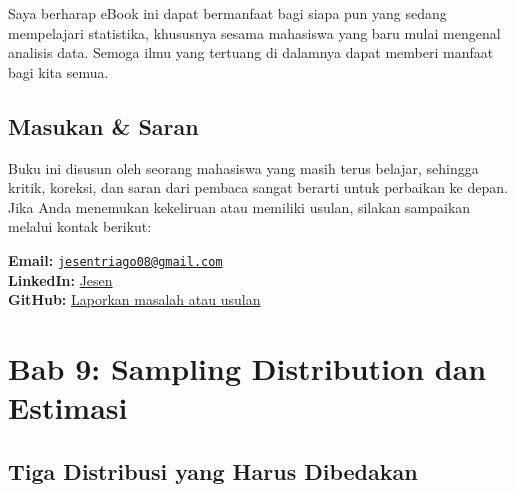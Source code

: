 \documentclass[
  indonesian,
  letterpaper,
]{book}
\begin{document}
Saya berharap eBook ini dapat bermanfaat bagi siapa pun yang sedang
mempelajari statistika, khususnya sesama mahasiswa yang baru mulai
mengenal analisis data. Semoga ilmu yang tertuang di dalamnya dapat
memberi manfaat bagi kita semua.

\section*{Masukan \& Saran}\label{masukan-saran}


Buku ini disusun oleh seorang mahasiswa yang masih terus belajar,
sehingga kritik, koreksi, dan saran dari pembaca sangat berarti untuk
perbaikan ke depan. Jika Anda menemukan kekeliruan atau memiliki usulan,
silakan sampaikan melalui kontak berikut:

\textbf{Email:}
\href{mailto:jesentriago08@gmail.com}{\nolinkurl{jesentriago08@gmail.com}}\\
\textbf{LinkedIn:} \href{https://www.linkedin.com/in/jesenn}{Jesen}\\
\textbf{GitHub:}
\href{https://github.com/sennie17/STATISITKA-EBOOK/issues}{Laporkan
masalah atau usulan}


\chapter{Bab 9: Sampling Distribution dan
Estimasi}\label{bab-9-sampling-distribution-dan-estimasi}

\section{Tiga Distribusi yang Harus
Dibedakan}\label{tiga-distribusi-yang-harus-dibedakan}
\end{document}
